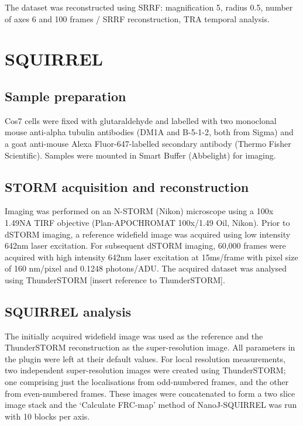 The dataset was reconstructed using SRRF: magnification 5, radius 0.5, number of axes 6 and 100 frames / SRRF reconstruction, TRA temporal analysis. 


\section{SQUIRREL}

\subsection{Sample preparation}

Cos7 cells were fixed with glutaraldehyde and labelled with two monoclonal mouse anti-alpha tubulin antibodies (DM1A and B-5-1-2, both from Sigma) and a goat anti-mouse Alexa Fluor-647-labelled secondary antibody (Thermo Fisher Scientific). Samples were mounted in Smart Buffer (Abbelight) for imaging.

\subsection{STORM acquisition and reconstruction}

Imaging was performed on an N-STORM (Nikon) microscope using a 100x 1.49NA TIRF objective (Plan-APOCHROMAT 100x/1.49 Oil, Nikon). Prior to dSTORM imaging, a reference widefield image was acquired using low intensity 642nm laser excitation. For subsequent dSTORM imaging, 60,000 frames were acquired with high intensity 642nm laser excitation at 15ms/frame with pixel size of 160 nm/pixel and 0.1248 photons/ADU. The acquired dataset was analysed using ThunderSTORM [insert reference to ThunderSTORM].

\subsection{SQUIRREL analysis}

The initially acquired widefield image was used as the reference and the ThunderSTORM reconstruction as the super-resolution image. All parameters in the plugin were left at their default values. For local resolution measurements, two independent super-resolution images were created using ThunderSTORM; one comprising just the localisations from odd-numbered frames, and the other from even-numbered frames. These images were concatenated to form a two slice image stack and the ‘Calculate FRC-map’ method of NanoJ-SQUIRREL was run with 10 blocks per axis.


